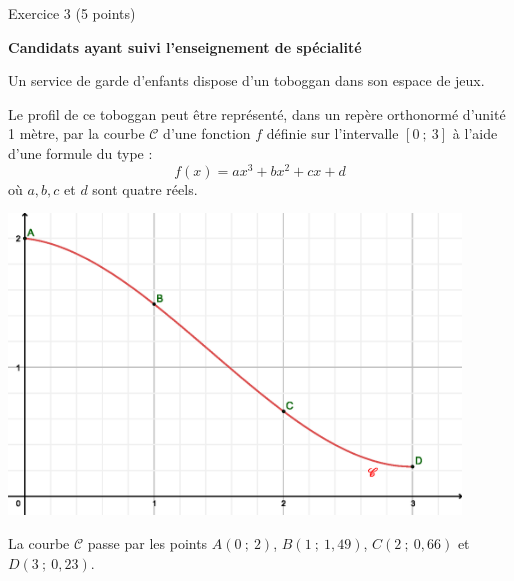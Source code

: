 
%
\begin{h2}Exercice 3 (5 points)\end{h2}
\par      
\textbf{Candidats ayant suivi l'enseignement de spécialité}
\par
%
%
\par
Un service de garde d'enfants dispose d'un toboggan dans son espace de jeux.
\par
Le profil de ce toboggan peut être représenté, dans un repère orthonormé d'unité 1 mètre, par la courbe $\mathscr{C}$ d'une fonction $f$ définie sur l'intervalle $[0~;~3]$ à l'aide d'une formule du type :
\[ f(x)=ax^3+bx^2+cx+d \]
où $a, b, c$ et $d$ sont quatre réels.
\par
\begin{center}
     \begin{extern}%
          \includegraphics[width=0.9\textwidth]{images/BBESL-spe-4-1}%
     \end{extern}
\end{center}
\par
La courbe $\mathscr{C}$ passe par les points $A(0~;~2)$, $B(1~;~1,49)$, $C(2~;~0,66)$ et $D(3~;~0,23)$.
\par

